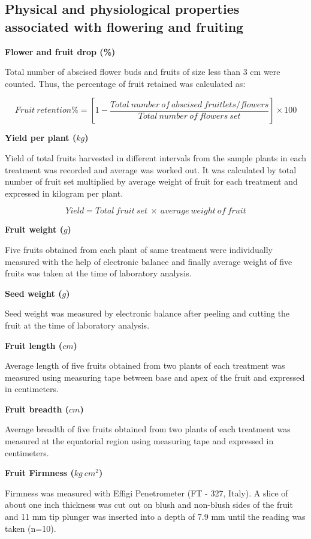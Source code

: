 \documentclass[]{article}
\begin{document}
\subsection{Physical and physiological properties associated with
flowering and
fruiting}\label{physical-and-physiological-properties-associated-with-flowering-and-fruiting}

\textbf{Flower and fruit drop (\%)}

Total number of abscised flower buds and fruits of size less than 3 cm
were counted. Thus, the percentage of fruit retained was calculated as:

\[
Fruit~retention \% = \left [ 1-\frac{Total~number~of~abscised~fruitlets/flowers}{Total~number~of~flowers~set}\right ] \times 100
\]

\textbf{Yield per plant (\(kg\))}

Yield of total fruits harvested in different intervals from the sample
plants in each treatment was recorded and average was worked out. It was
calculated by total number of fruit set multiplied by average weight of
fruit for each treatment and expressed in kilogram per plant.

\[Yield = Total~fruit~set~\times~average~weight~of~fruit\]

\textbf{Fruit weight (\(g\))}

Five fruits obtained from each plant of same treatment were individually
measured with the help of electronic balance and finally average weight
of five fruits was taken at the time of laboratory analysis.

\textbf{Seed weight (\(g\))}

Seed weight was measured by electronic balance after peeling and cutting
the fruit at the time of laboratory analysis.

\textbf{Fruit length (\(cm\))}

Average length of five fruits obtained from two plants of each treatment
was measured using measuring tape between base and apex of the fruit and
expressed in centimeters.

\textbf{Fruit breadth (\(cm\))}

Average breadth of five fruits obtained from two plants of each
treatment was measured at the equatorial region using measuring tape and
expressed in centimeters.

\textbf{Fruit Firmness (\(kg~cm^2\))}

Firmness was measured with Effigi Penetrometer (FT - 327, Italy). A
slice of about one inch thickness was cut out on blush and non-blush
sides of the fruit and 11 mm tip plunger was inserted into a depth of
7.9 mm until the reading was taken (n=10).
\end{document}
